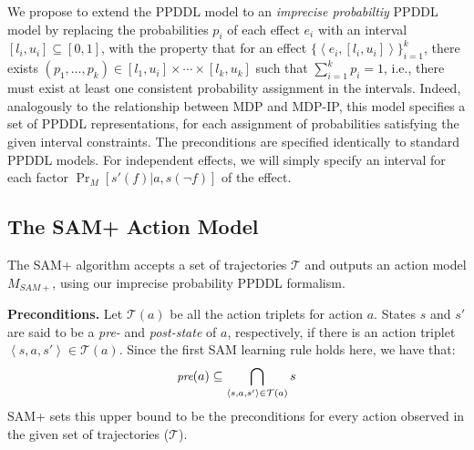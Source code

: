 \documentclass[letterpaper]{article} %
\newcommand{\pre}{\textit{pre}}
\newcommand{\tuple}[1]{\ensuremath{\left \langle #1 \right \rangle }}
\begin{document}
We propose to extend the PPDDL model to an \emph{imprecise probabiltiy} PPDDL model by replacing the probabilities $p_i$ of each effect $e_i$ with an interval $[l_i,u_i]\subseteq [0,1]$, with the property that for an effect $\{\tuple{e_i,[l_i,u_i]}\}_{i=1}^k$, there exists $(p_1,\ldots,p_k)\in [l_1,u_i]\times \cdots \times [l_k,u_k]$ such that $\sum_{i=1}^kp_i = 1$, i.e., there must exist at least one consistent probability assignment in the intervals. Indeed, analogously to the relationship between MDP and MDP-IP, this model specifies a set of PPDDL representations, for each assignment of probabilities satisfying the given interval constraints. The preconditions are specified identically to standard PPDDL models. For independent effects, we will simply specify an interval for each factor $\Pr_M[s'(f)|a,s(\neg f)]$ of the effect.



\subsection{The SAM+ Action Model}


The SAM+ algorithm accepts a set of trajectories $\mathcal{T}$ and outputs an action model $M_{SAM+}$, using our imprecise probability PPDDL formalism. 

\noindent \textbf{Preconditions.} 
Let $\mathcal{T}(a)$ be all the action triplets for action $a$. 
States $s$ and $s'$ are said to be a \emph{pre-} and \emph{post-state} of $a$, respectively, if there is an action triplet $\tuple{s,a,s'}\in \mathcal{T}(a)$. 
Since the first SAM learning rule holds here, we have that:
\begin{equation}
\small
        \pre(a) \subseteq  \bigcap_{\tuple{s, a, s'}\in \mathcal{T}(a)} s \label{eq:pre} 
\end{equation}        
SAM+ sets this upper bound to be the preconditions for every action observed in the given set of trajectories ($\mathcal{T}$). %
\end{document}
